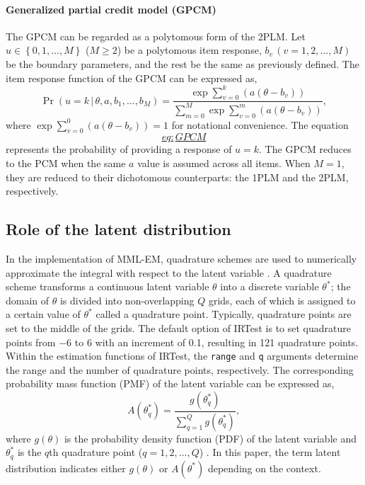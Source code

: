 \hypertarget{generalized-partial-credit-model-gpcm}{%
\paragraph{Generalized partial credit model (GPCM)}\label{generalized-partial-credit-model-gpcm}}

The GPCM can be regarded as a polytomous form of the 2PLM. Let
\(u \in \left\{0, 1, \dots, M\right\}\) (\(M \ge 2\)) be a polytomous item
response, \(b_v \, (v = 1, 2, \dots, M)\) be the boundary parameters, and
the rest be the same as previously defined. The item response function
of the GPCM can be expressed as,
\[\Pr( u = k \, | \, \theta, a, b_1, \dots , b_M)  =
\frac{ \exp{ \sum_{v = 0}^{k}{\left(a (\theta - b_v) \right)}} }
{ \sum_{m = 0}^{M}{\exp{ \sum_{v = 0}^{m}{\left(a (\theta - b_v) \right)}} }},
\label{eq:GPCM}\] where
\(\exp{ \sum_{v = 0}^{0}{\left(a (\theta - b_v) \right)}} = 1\) for
notational convenience. The equation
\protect\hyperlink{eq:GPCM}{\[eq:GPCM\]}
represents the probability of providing a response of \(u = k\). The GPCM
reduces to the PCM when the same \(a\) value is assumed across all items.
When \(M = 1\), they are reduced to their dichotomous counterparts: the
1PLM and the 2PLM, respectively.

\hypertarget{role-of-latent-distribution}{%
\subsection{Role of the latent distribution}\label{role-of-latent-distribution}}

In the implementation of MML-EM, quadrature schemes are used to
numerically approximate the integral with respect to the latent variable
\citep{Baker+Kim:2004, Bock+Aitkin:1981}. A quadrature scheme transforms a
continuous latent variable \(\theta\) into a discrete variable
\(\theta^{*}\); the domain of \(\theta\) is divided into non-overlapping \(Q\)
grids, each of which is assigned to a certain value of \(\theta^{*}\)
called a quadrature point. Typically, quadrature points are set to the
middle of the grids. The default option of IRTest is to set quadrature
points from \(-6\) to \(6\) with an increment of 0.1, resulting in 121
quadrature points. Within the estimation functions of IRTest, the
\texttt{range} and \texttt{q} arguments determine the range and the number of
quadrature points, respectively. The corresponding probability mass
function (PMF) of the latent variable can be expressed as,
\[A \left( \theta^{*}_{q} \right) =
\frac{ g \left( \theta^{*}_{q} \right) }
{ \sum_{ q = 1 }^{Q}{g \left( \theta^{*}_{q} \right)} },
\label{eq:quadrature}\] where \(g{ \left( \theta \right)}\) is the
probability density function (PDF) of the latent variable and
\(\theta^{*}_{q}\) is the \(q\)th quadrature point (\(q = 1, 2, \dots, Q\))
\citep{Baker+Kim:2004}. In this paper, the term latent distribution indicates
either \(g{ \left( \theta \right)}\) or \(A{ \left( \theta^{*} \right)}\)
depending on the context.

